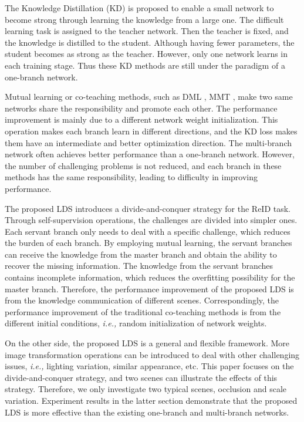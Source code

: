 \documentclass[a4paper]{cas-dc}
\begin{document}
The Knowledge Distillation (KD) \cite{RN507} is proposed to enable a small network to become strong through learning the knowledge from a large one. The difficult learning task is assigned to the teacher network. Then the teacher is fixed, and the knowledge is distilled to the student. Although having fewer parameters, the student becomes as strong as the teacher. However, only one network learns in each training stage. Thus these KD methods are still under the paradigm of a one-branch network.

Mutual learning or co-teaching methods, such as DML \cite{RN187}, MMT \cite{RN339}, make two same networks share the responsibility and promote each other. The performance improvement is mainly due to a different network weight initialization. This operation makes each branch learn in different directions, and the KD loss makes them have an intermediate and better optimization direction. The multi-branch network often achieves better performance than a one-branch network. However, the number of challenging problems is not reduced, and each branch in these methods has the same responsibility, leading to difficulty in improving performance.

The proposed LDS introduces a divide-and-conquer strategy for the ReID task. Through self-supervision operations, the challenges are divided into simpler ones. Each servant branch only needs to deal with a specific challenge, which reduces the burden of each branch. By employing mutual learning, the servant branches can receive the knowledge from the master branch and obtain the ability to recover the missing information. The knowledge from the servant branches contains incomplete information, which reduces the overfitting possibility for the master branch. Therefore, the performance improvement of the proposed LDS is from the knowledge communication of different scenes. Correspondingly, the performance improvement of the traditional co-teaching methods is from the different initial conditions, \textit{i.e.,} random initialization of network weights. 

On the other side, the proposed LDS is a general and flexible framework. More image transformation operations can be introduced to deal with other challenging issues, \textit{i.e.,} lighting variation, similar appearance, etc. This paper focuses on the divide-and-conquer strategy, and two scenes can illustrate the effects of this strategy. Therefore, we only investigate two typical scenes, occlusion and scale variation. Experiment results in the latter section demonstrate that the proposed LDS is more effective than the existing one-branch and multi-branch networks.
\end{document}
